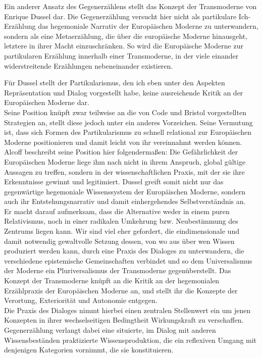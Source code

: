 Ein anderer Ansatz des Gegenerzählens stellt das Konzept der Transmoderne von
Enrique Dussel dar. Die Gegenerzählung versucht hier nicht als partikulare
Ich-Erzählung das hegemoniale Narrativ der Europäischen Moderne zu unterwandern,
sondern als eine Metaerzählung, die über die europäische Moderne hinausgeht,
letztere in ihrer Macht einzuschränken. So wird die Europäische Moderne zur
partikularen Erzählung innerhalb einer Transmoderne, in der viele einander
widerstreitende Erzählungen nebeneinander existieren.

Für Dussel stellt der Partikularismus, den ich eben unter den Aspekten
Repräsentation und Dialog vorgestellt habe, keine ausreichende Kritik an der
Europäischen Moderne dar. \\
Seine Position knüpft zwar teilweise an die von Code
und Bristol vorgestellten Strategien an, stellt diese jedoch unter ein anderes
Vorzeichen. Seine Vermutung ist, dass sich Formen des Partikularismus zu schnell
relational zur Europäischen Moderne positionieren und damit leicht von ihr
vereinnahmt werden können. Alcoff beschreibt seine Position hier folgendermaßen:
Die Gefährlichkeit der Europäischen Moderne liege ihm nach nicht in ihrem
Anspruch, global gültige Aussagen zu treffen, sondern in der wissenschaftlichen
Praxis, mit der sie ihre Erkenntnisse gewinnt und legitimiert.\footnotemark
{} Dussel greift somit nicht
nur das gegenwärtige hegemoniale Wissenssystem der Europäischen Moderne, sondern
auch ihr Entstehungsnarrativ und damit einhergehendes Selbstverständnis an.
\\

Er macht darauf aufmerksam, dass die Alternative weder in einem puren
Relativismus, noch in einer radikalen Umkehrung bzw. Neubestimmung des Zentrums
liegen kann. Wir sind viel eher gefordert, die eindimensionale und damit
notwendig gewaltvolle Setzung dessen, von wo aus über wen Wissen produziert
werden kann, durch eine Praxis des Dialoges zu unterwandern, die verschiedene
epistemische Gemeinschaften verbindet und so dem Universalismus der Moderne ein
Pluriversalismus der Transmoderne gegenüberstellt. Das Konzept der Transmoderne
knüpft an die Kritik an der hegemonialen Erzählpraxis der Europäischen Moderne
an, und stellt ihr die Konzepte der Verortung, Exteriorität und Autonomie
entgegen. \\
Die Praxis des Dialoges nimmt hierbei einen zentralen Stellenwert ein
um jenen Konzepten in ihrer wechselseitigen Bedingtheit Wirkungskraft zu
verschaffen. Gegenerzählung verlangt dabei eine situierte, im Dialog mit anderen
Wissensbeständen praktizierte Wissensproduktion, die ein reflexiven Umgang mit
denjenigen Kategorien vornimmt, die sie konstituieren.
\\

